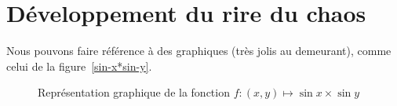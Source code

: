 \chapter{Développement du rire du chaos}

Nous pouvons faire référence à des graphiques (très jolis au demeurant), comme
celui de la figure~\vref{sin-x*sin-y}.
\lipsum[3-10]
\begin{figure}[ht]
  \centering
  \capstart
  \caption{Représentation graphique de la fonction $f:(x,y)\mapsto
    \sin x\times\sin y$}
  \label{sin-x*sin-y}
\end{figure}

